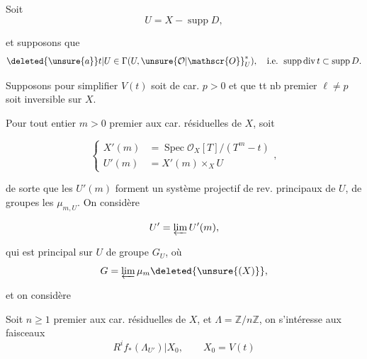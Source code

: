 
Soit
\[
U=X-\operatorname{supp}D,
\]

et supposons que
\[
\deleted{\unsure{a}}t|U\in\Gamma(U,\unsure{\mathcal{O}|\mathscr{O}}_U^*),\quad\text{i.e. }\operatorname{supp}\operatorname{div}t\subset\operatorname{supp}D.
\]

 Supposons pour simplifier  $V(t)$ soit de car. $p>0$ et que tt nb premier $\ell\ne p$ soit inversible sur $X$.

Pour tout  entier $m>0$ premier aux car. résiduelles de $X$,  soit

\[
\left\{\begin{aligned}
X'(m)&=\operatorname{Spec}\mathcal{O}_X[T]/(T^m-t)\\
U'(m)&=X'(m)\times_X U
\end{aligned}\right.,
\]

de sorte que les $U'(m)$ forment un système projectif de rev.  principaux de $U$, de groupes les $\mu_{m,U}$. On considère

\[
U'=\varprojlim U'(m),
\]

qui est principal sur $U$ de groupe  $G_U$, où
\[
G=\varprojlim\mu_m\deleted{\unsure{(X)}},
\]

et on  considère  

Soit $n\geq1$ premier aux car. résiduelles de $X$, et  $\Lambda=\mathbb{Z}/n\mathbb{Z}$, on s'intéresse aux faisceaux
\[
R^i f_*(\Lambda_{U'})|X_0,\qquad X_0=V(t)
\]
